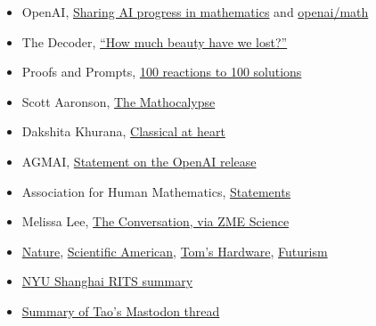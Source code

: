 \documentclass[11pt]{article}
\begin{document}
\begin{itemize}
\item OpenAI,
  \href{https://openai.com/index/sharing-ai-progress-in-mathematics/}{Sharing AI progress in mathematics}
  and \href{https://github.com/openai/math}{openai/math}
\item The Decoder,
  \href{https://the-decoder.com/how-much-beauty-have-we-lost-mathematicians-react-with-shock-and-disgust-as-openai-bulldozes-their-field/}{``How much beauty have we lost?''}
\item Proofs and Prompts,
  \href{https://proofsandprompts.com/2026/10/08/100-reactions-to-100-solutions/}{100 reactions to 100 solutions}
\item Scott Aaronson, \href{https://scottaaronson.blog/?p=10169}{The Mathocalypse}
\item Dakshita Khurana,
  \href{https://dakshitakhurana.substack.com/p/classical-at-heart}{Classical at heart}
\item AGMAI, \href{https://agmai.org/\#openai-release}{Statement on the OpenAI release}
\item Association for Human Mathematics,
  \href{https://www.ahmath.org/statements}{Statements}
\item Melissa Lee,
  \href{https://www.zmescience.com/science/news-science/openai-released-722-math-papers-at-once-and-mathematicians-are-freaking-out/}{The Conversation, via ZME Science}
\item \href{https://www.nature.com/articles/d41586-026-03196-8}{Nature},
  \href{https://www.scientificamerican.com/article/openai-unleashes-hundreds-more-math-results-upon-a-field-already-in-shock/}{Scientific American},
  \href{https://www.tomshardware.com/tech-industry/artificial-intelligence/ai-causes-uproar-in-mathematics-as-experts-warn-against-sharing-research-with-llms-after-openai-shares-722-manuscripts-and-proofs-professor-argues-that-the-field-must-focus-on-building-community-over-raw-solutions}{Tom's Hardware},
  \href{https://futurism.com/artificial-intelligence/mathematicians-openai-furious}{Futurism}
\item \href{https://rits.shanghai.nyu.edu/ai/openai-drops-722-math-manuscripts-from-an-unreleased-model}{NYU Shanghai RITS summary}
\item \href{https://blog.donweb.com/terence-tao-openai-matematica-math-1-0/}{Summary of Tao's Mastodon thread}
\end{itemize}
\end{document}
